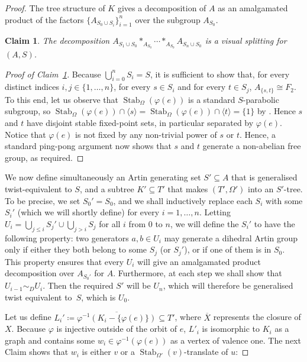 \documentclass[svgnames]{amsart}
\theoremstyle{plain}
\newtheorem{claim}[thm]{Claim}
\theoremstyle{definition}
\newenvironment{claimproof}{\renewcommand{\qedsymbol}{$\blacksquare$}\begin{proof}}{\end{proof}}
\newcommand{\Stab}[2]{\operatorname{Stab}_{#1}\left(#2\right)}
\renewcommand{\phi}{\varphi}
\begin{document}
\begin{proof}
    \noindent The tree structure of $K$ gives a decomposition of $A$ as an amalgamated product of the factors $\{A_{S_0\cup S_i}\}_{i=1}^n$ over the subgroup $A_{S_0}$. 
    
    \begin{claim}\label{claim:dec}
        The decomposition $A_{S_1\cup S_0}*_{A_{S_0}}\cdots *_{A_{S_0}}A_{S_n\cup S_0}$ is a visual splitting for $(A,S)$.
    \end{claim}

    \begin{claimproof}[Proof of Claim~\ref{claim:dec}]
    Because $\bigcup_{i=0}^nS_i=S$, it is sufficient to show that, for every distinct indices $i,j\in\{1,\dots,n\}$, for every $s\in S_i$ and for every $t\in S_j$, $A_{\{s,t\}}\cong F_2$. To this end, let us observe that $\Stab{\Omega}{\phi(e)}$ is a standard $S$-parabolic subgroup, so $\Stab{\Omega}{\phi(e)}\cap \langle s\rangle=\Stab{\Omega}{\phi(e)}\cap \langle t\rangle=\{1\}$ by \cite{VanDerLek}. Hence $s$ and $t$ have disjoint stable fixed-point sets, in particular separated by $\phi(e)$. Notice that $\phi(e)$ is not fixed by any non-trivial power of $s$ or $t$. Hence, a standard ping-pong argument now shows that $s$ and $t$ generate a non-abelian free group, as required.\end{claimproof}

    We now define simultaneously an Artin generating set $S'\subseteq A$ that is generalised twist-equivalent to $S$, and a subtree $K'\subseteq T'$ that makes $(T',\Omega')$ into an $S'$-tree. To be precise, we set $S_0'=S_0$, and we shall inductively replace each $S_i$ with some $S_i'$ (which we will shortly define) for every $i=1,\ldots,n$. Letting $U_{i}=\bigcup_{j\le i}S_j'\cup \bigcup_{j> i}S_j$ for all $i$ from $0$ to $n$, we will define the $S_i'$ to have the following property: two generators $a,b\in U_i$ may generate a dihedral Artin group only if either they both belong to some $S_j$ (or $S_j'$), or if one of them is in $S_0$. This property ensures that every $U_i$ will give an amalgamated product decomposition over $A_{S_0'}$ for $A$. Furthermore, at each step we shall show that $U_{i-1}\sim_D U_{i}$. Then the required $S'$ will be $U_n$, which will therefore be generalised twist equivalent to~$S$, which is $U_0$.

    

    Let us define $L_i'\coloneqq\overline{\phi^{-1}(K_i-\{\phi(e)\})}\subseteq T'$, where $\overline{X}$ represents the closure of $X$. Because $\phi$ is injective outside of the orbit of $e$, $L'_i$ is isomorphic to $K_i$ as a graph and contains some $w_i\in \phi^{-1}(\phi(e))$ as a vertex of valence one. The next Claim shows that  $w_i$ is either $v$ or a $\Stab{\Omega'}{v}$-translate of $u$:


\end{proof}
\end{document}

